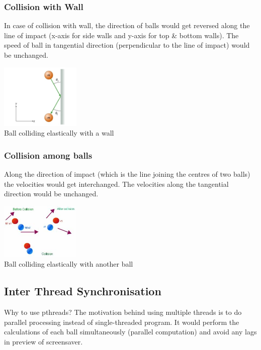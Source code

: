 \documentclass[10pt]{article}
\begin{document}
		\subsubsection{Collision with Wall}
			In case of collision with wall, the direction of balls would get reversed along the line of impact (x-axis for side walls and y-axis for top \& bottom walls). 
			The speed of ball in tangential direction (perpendicular to the line of impact) would be unchanged.
			
			\begin{center}
			\includegraphics[width = 1.5in]{cwall.jpg}\\
			\textsf{Ball colliding elastically with a wall}
			\end{center}
			

		\subsubsection{Collision among balls}		
			Along the direction of impact (which is the line joining the centres of two balls) the velocities would get interchanged.
			The velocities along the tangential direction would be unchanged.
			\begin{center}
			\includegraphics[width = 1.5in]{cball.jpeg}\\
			\textsf{Ball colliding elastically with another ball}
			\end{center}
	\subsection{Inter Thread Synchronisation}
	Why to use pthreads?
	The motivation behind using multiple threads is to do parallel processing instead of single-threaded program. It would perform the calculations of each ball simultaneously (parallel computation) and avoid any lags in preview of screensaver.
	
\end{document}

